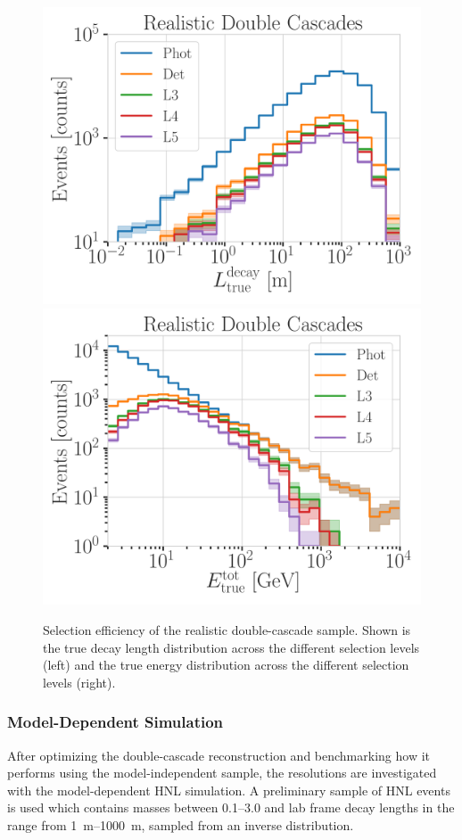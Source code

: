 \begin{figure}[h]
	\centering
    \includegraphics[width=0.49\linewidth]{figures/model_independent_simulation/results/realistic/selection/hnl_selection_efficiency_decay_l_true_unweighted.png}
    \includegraphics[width=0.49\linewidth]{figures/model_independent_simulation/results/realistic/selection/hnl_selection_efficiency_energy_true_unweighted.png}
    \caption[Realistic double-cascade selection efficiency]{Selection efficiency of the realistic  double-cascade sample. Shown is the true decay length distribution across the different selection levels (left) and the true energy distribution across the different selection levels (right).}
\end{figure}


\subsubsection{Model-Dependent Simulation}

After optimizing the double-cascade reconstruction and benchmarking how it performs using the model-independent sample, the resolutions are investigated with the model-dependent HNL simulation. A preliminary sample of HNL events is used which contains masses between \SIrange[range-phrase=~and~]{0.1}{3.0}{\gev} and lab frame decay lengths in the range from \SIrange{1}{1000}{\meter}, sampled from an inverse distribution.

